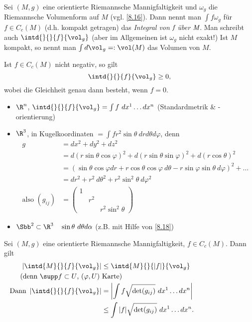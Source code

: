 \lecture

\begin{defn}\autolabel
	Sei \( (M,g) \) eine orientierte Riemannsche Mannigfaltigkeit und \( \omega_g \) die Riemannsche Volumenform auf $M$ (vgl. \ref{8.16}). Dann nennt man \( \int f \omega_g \) für \( f \in C_c(M) \) (d.h. kompakt getragen) das \emph{Integral von $\emph{f}$ über \( \emph{M} \)}.
	Man schreibt auch \( \intd{}{}{f}{\vol_g} \) (aber im Allgemeinen ist $\omega_g$ nicht exakt!) Ist $M$ kompakt, so nennt man \( \int d\vol_g =: \vol(M) \) das Volumen von $M$.
\end{defn}

\begin{lem*}
	Ist $f \in C_c(M)$ nicht negativ, so gilt
	\[ \intd{}{}{f}{\vol_g} \geq 0, \]
	wobei die Gleichheit genau dann besteht, wenn \( f=0 \).
\end{lem*}

\begin{exmp*}
	\begin{itemize}
		\item $\R^n$, \( \intd{}{}{f}{\vol_g} = \int f \ dx^1 \dots dx^n \) (Standardmetrik \& -orientierung)
		\item $\R^3$, in Kugelkoordinaten \( = \int fr^2\sin\theta \ dr d\theta d\varphi \), denn
			\begin{align*}
				g &= dx^2 + dy^2 + dz^2\\
				&= d(r\sin\theta\cos\varphi)^2 + d(r\sin\theta\sin\varphi)^2 + d(r\cos\theta)^2\\
				&= (\sin\theta\cos\varphi dr + r\cos\theta\cos\varphi\ d\theta - r\sin\varphi\sin\theta\ d\varphi)^2 + \dots\\
				&= dr^2 + r^2\ d\theta^2 + r^2\sin^2\theta\ d\varphi^2\\
				\text{also } (g_{ij}) &= \begin{pmatrix}
					1 & &\\
					& r^2 &\\
					& & r^2\sin^2\theta
				\end{pmatrix}
			\end{align*}
		\item \( \Sbb^2 \subset \R^3 \quad \sin\theta\ d\theta d\alpha \) (z.B. mit Hilfe von \ref{8.18})
	\end{itemize}
\end{exmp*}

\begin{lem}\autolabel
	Sei \( (M,g) \) eine orientierte Riemannsche Mannigfaltigkeit, $f \in C_c(M)$. Dann gilt
	\begin{align*}
		\left| \intd{M}{}{f}{\vol_g} \right| &\leq \intd{M}{}{|f|}{\vol_g}\\
		\noalign{(denn $\supp f \subset U$, $(\varphi,U)$ Karte)}
		\text{Dann } \left| \intd{}{}{f}{\vol_g} \right| &= \left| \int f \sqrt{\det(g_{ij})}\ dx^1 \dots dx^n \right|\\
		&\leq \int |f| \sqrt{\det(g_{ij})}\ dx^1 \dots dx^n.
	\end{align*}
\end{lem}

